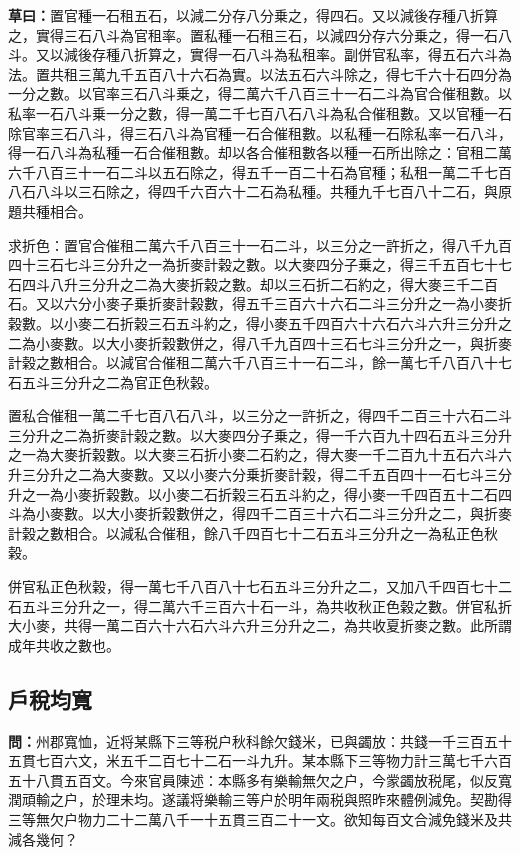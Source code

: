 \documentclass[11pt,a4paper]{article}
\newcommand{\Question}[1]{\par\noindent\textbf{\color{problemcolor}問：}#1\par}
\newcommand{\Working}[1]{\par\noindent\textbf{草曰：}#1\par}
\begin{document}
\Working{置官種一石租五石，以減二分存八分乗之，得四石。又以減後存種八折算之，實得三石八斗為官租率。置私種一石租三石，以減四分存六分乗之，得一石八斗。又以減後存種八折算之，實得一石八斗為私租率。副併官私率，得五石六斗為法。置共租三萬九千五百八十六石為實。以法五石六斗除之，得七千六十石四分為一分之數。以官率三石八斗乗之，得二萬六千八百三十一石二斗為官合催租數。以私率一石八斗乗一分之數，得一萬二千七百八石八斗為私合催租數。又以官種一石除官率三石八斗，得三石八斗為官種一石合催租數。以私種一石除私率一石八斗，得一石八斗為私種一石合催租數。却以各合催租數各以種一石所出除之：官租二萬六千八百三十一石二斗以五石除之，得五千一百二十石為官種；私租一萬二千七百八石八斗以三石除之，得四千六百六十二石為私種。共種九千七百八十二石，與原題共種相合。

求折色：置官合催租二萬六千八百三十一石二斗，以三分之一許折之，得八千九百四十三石七斗三分升之一為折麥計榖之數。以大麥四分子乗之，得三千五百七十七石四斗八升三分升之二為大麥折榖之數。却以三石折二石約之，得大麥三千二百石。又以六分小麥子乗折麥計榖數，得五千三百六十六石二斗三分升之一為小麥折榖數。以小麥二石折榖三石五斗約之，得小麥五千四百六十六石六斗六升三分升之二為小麥數。以大小麥折榖數併之，得八千九百四十三石七斗三分升之一，與折麥計榖之數相合。以減官合催租二萬六千八百三十一石二斗，餘一萬七千八百八十七石五斗三分升之二為官正色秋榖。

置私合催租一萬二千七百八石八斗，以三分之一許折之，得四千二百三十六石二斗三分升之二為折麥計榖之數。以大麥四分子乗之，得一千六百九十四石五斗三分升之一為大麥折榖數。以大麥三石折小麥二石約之，得大麥一千二百九十五石六斗六升三分升之二為大麥數。又以小麥六分乗折麥計榖，得二千五百四十一石七斗三分升之一為小麥折榖數。以小麥二石折榖三石五斗約之，得小麥一千四百五十二石四斗為小麥數。以大小麥折榖數併之，得四千二百三十六石二斗三分升之二，與折麥計榖之數相合。以減私合催租，餘八千四百七十二石五斗三分升之一為私正色秋榖。

併官私正色秋榖，得一萬七千八百八十七石五斗三分升之二，又加八千四百七十二石五斗三分升之一，得二萬六千三百六十石一斗，為共收秋正色榖之數。併官私折大小麥，共得一萬二百六十六石六斗六升三分升之二，為共收夏折麥之數。此所謂成年共收之數也。}

\subsection*{\color{sectioncolor}戶稅均寬}

\Question{州郡寬恤，近将某縣下三等税户秋科餘欠錢米，已與蠲放：共錢一千三百五十五貫七百六文，米五千二百七十二石一斗九升。某本縣下三等物力計三萬七千六百五十八貫五百文。今來官員陳述：本縣多有樂輸無欠之户，今䝉蠲放税尾，似反寬潤頑輸之户，於理未均。遂議将樂輸三等户於明年兩税與照昨來體例減免。契勘得三等無欠户物力二十二萬八千一十五貫三百二十一文。欲知每百文合減免錢米及共減各幾何？}
\end{document}
